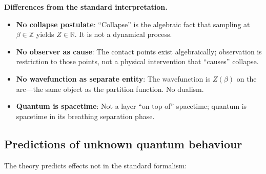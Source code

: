 \documentclass[12pt,a4paper]{article}
\begin{document}
\noindent\textbf{Differences from the standard interpretation.}
\begin{itemize}[nosep]
\item \textbf{No collapse postulate}: ``Collapse'' is the algebraic fact that sampling at $\beta \in \mathbb{Z}$ yields $Z \in \mathbb{R}$. It is not a dynamical process.
\item \textbf{No observer as cause}: The contact points exist algebraically; observation is restriction to those points, not a physical intervention that ``causes'' collapse.
\item \textbf{No wavefunction as separate entity}: The wavefunction is $Z(\beta)$ on the arc---the same object as the partition function. No dualism.
\item \textbf{Quantum is spacetime}: Not a layer ``on top of'' spacetime; quantum is spacetime in its breathing separation phase.
\end{itemize}

\subsection{Predictions of unknown quantum behaviour}

The theory predicts effects not in the standard formalism:
\end{document}
